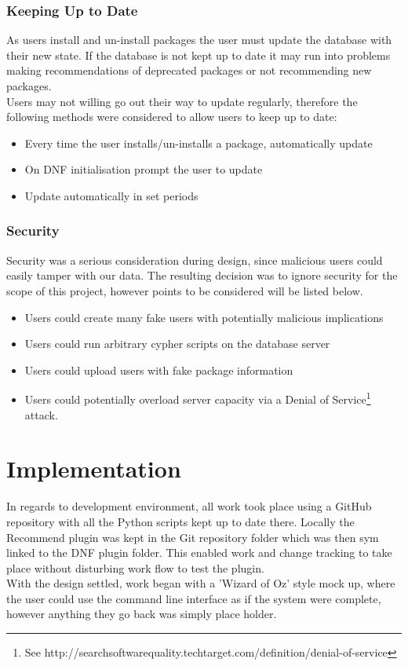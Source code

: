\documentclass{l4proj}
\begin{document}
\subsection{Keeping Up to Date}
As users install and un-install packages the user must update the database with their new state. If the database is not kept up to date it may run into problems making recommendations of deprecated packages or not recommending new packages.\\
Users may not willing go out their way to update regularly, therefore the following methods were considered to allow users to keep up to date:\\
\begin{itemize}
\item Every time the user installs/un-installs a package, automatically update
\item On DNF initialisation prompt the user to update
\item Update automatically in set periods
\end{itemize}

\subsection{Security}
Security was a serious consideration during design, since malicious users could easily tamper with our data. The resulting decision was to ignore security for the scope of this project, however points to be considered will be listed below.\\
\begin{itemize}
\item Users could create many fake users with potentially malicious implications
\item Users could run arbitrary cypher scripts on the database server
\item Users could upload users with fake package information
\item Users could potentially overload server capacity via a Denial of Service\footnote{See http://searchsoftwarequality.techtarget.com/definition/denial-of-service} attack.
\end{itemize}

 
\chapter{Implementation}
In regards to development environment, all work took place using a GitHub repository with all the Python scripts kept up to date there. Locally the Recommend plugin was kept in the Git repository folder which was then sym linked to the DNF plugin folder. This enabled work and change tracking to take place without disturbing work flow to test the plugin.\\
With the design settled, work began with a 'Wizard of Oz'\cite{wizofoz} style mock up, where the user could use the command line interface as if the system were complete, however anything they go back was simply place holder.
\end{document}
